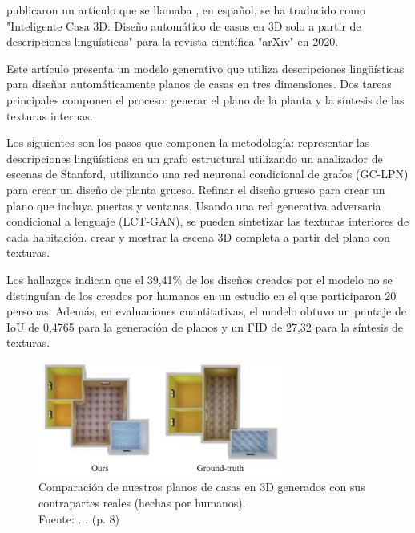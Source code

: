 \newpage
\cite{pr_chen2020intelhome3d} publicaron un artículo que se llamaba , en español, se ha traducido como "Inteligente Casa 3D: Diseño automático de casas en 3D solo a partir de descripciones lingüísticas" para la revista científica "arXiv" en 2020.

Este artículo presenta un modelo generativo que utiliza descripciones lingüísticas para diseñar automáticamente planos de casas en tres dimensiones. Dos tareas principales componen el proceso: generar el plano de la planta y la síntesis de las texturas internas.

Los siguientes son los pasos que componen la metodología: representar las descripciones lingüísticas en un grafo estructural utilizando un analizador de escenas de Stanford, utilizando una red neuronal condicional de grafos (GC-LPN) para crear un diseño de planta grueso. Refinar el diseño grueso para crear un plano que incluya puertas y ventanas, Usando una red generativa adversaria condicional a lenguaje (LCT-GAN), se pueden sintetizar las texturas interiores de cada habitación. crear y mostrar la escena 3D completa a partir del plano con texturas.

Los hallazgos indican que el 39,41\% de los diseños creados por el modelo no se distinguían de los creados por humanos en un estudio en el que participaron 20 personas. Además, en evaluaciones cuantitativas, el modelo obtuvo un puntaje de IoU de 0,4765 para la generación de planos y un FID de 27,32 para la síntesis de texturas.

\begin{figure}[!ht]
	\begin{center}
		\includegraphics[width=0.73\textwidth]{2/figures/chen2020.png}
		\caption[Comparación de nuestros planos de casas en 3D generados con sus contrapartes reales (hechas por humanos)]{Comparación de nuestros planos de casas en 3D generados con sus contrapartes reales (hechas por humanos).\\
		Fuente: \cite{pr_chen2020intelhome3d}. . (p. 8)}
		\label{2:fig128}
	\end{center}
\end{figure}

